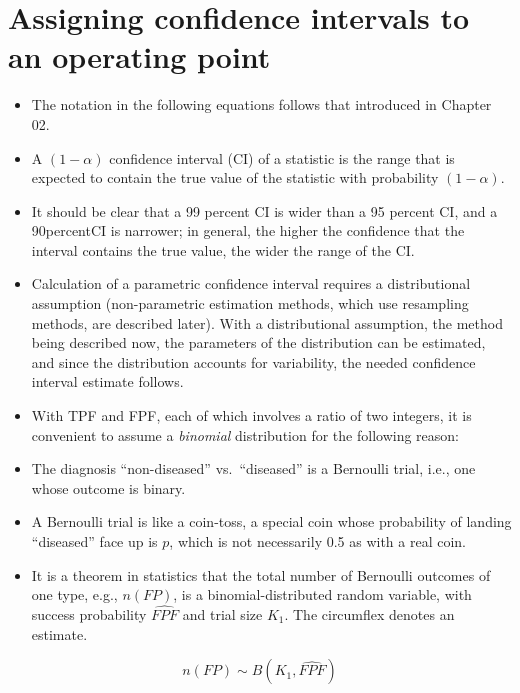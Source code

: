 \documentclass[
]{book}
\providecommand{\tightlist}{%
  \setlength{\itemsep}{0pt}\setlength{\parskip}{0pt}}
\begin{document}
\hypertarget{assigning-confidence-intervals-to-an-operating-point}{%
\section{Assigning confidence intervals to an operating point}\label{assigning-confidence-intervals-to-an-operating-point}}

\begin{itemize}
\tightlist
\item
  The notation in the following equations follows that introduced in Chapter 02.
\item
  A \((1-\alpha)\) confidence interval (CI) of a statistic is the range that is expected to contain the true value of the statistic with probability \((1-\alpha)\).
\item
  It should be clear that a 99 percent CI is wider than a 95 percent CI, and a 90percentCI is narrower; in general, the higher the confidence that the interval contains the true value, the wider the range of the CI.
\item
  Calculation of a parametric confidence interval requires a distributional assumption (non-parametric estimation methods, which use resampling methods, are described later). With a distributional assumption, the method being described now, the parameters of the distribution can be estimated, and since the distribution accounts for variability, the needed confidence interval estimate follows.
\item
  With TPF and FPF, each of which involves a ratio of two integers, it is convenient to assume a \emph{binomial} distribution for the following reason:
\item
  The diagnosis ``non-diseased'' vs.~``diseased'' is a Bernoulli trial, i.e., one whose outcome is binary.
\item
  A Bernoulli trial is like a coin-toss, a special coin whose probability of landing ``diseased'' face up is \(p\), which is not necessarily 0.5 as with a real coin.
\item
  It is a theorem in statistics that the total number of Bernoulli outcomes of one type, e.g., \(n(FP)\), is a binomial-distributed random variable, with success probability \(\widehat{FPF}\) and trial size \(K_1\). The circumflex denotes an estimate.
\end{itemize}

\begin{equation} 
n(FP) \sim B\left ( K_1, \widehat{FPF} \right )
\label{eq:binaryTask-BinDistrFPF}
\end{equation}
\end{document}
